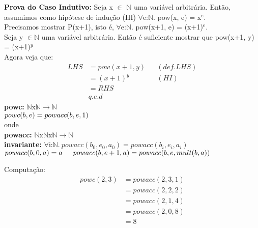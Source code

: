 \documentclass{article}
\begin{document}
\textbf{Prova do Caso Indutivo:} Seja x $\in$ $\mathbb{N}$ uma variável arbitrária. Então, assumimos como hipótese de indução (HI)
$\forall$e:$\mathbb{N}$. pow(x, e) = x$^e$.\\
Precisamos mostrar P(x+1), isto é, $\forall$e:$\mathbb{N}$. pow(x+1, e) = (x+1)$^e$.\\
Seja y $\in \mathbb{N}$ uma variável arbitrária. Então é suficiente mostrar que pow(x+1, y) = (x+1)$^y$\\
Agora veja que:
\begin{align*}
LHS &= pow(x+1, y) && (def. LHS)\\
&= (x+1)^y && (HI)\\
&= RHS \\
& q.e.d
\end{align*}
\noindent \textbf{powc:} $\mathbb{N}$x$\mathbb{N}$$ \rightarrow \mathbb{N}$\\
$powc(b, e) = powacc(b, e, 1)\\$
\\
onde\\
\indent \textbf{powacc:} $\mathbb{N}$x$\mathbb{N}$x$\mathbb{N}$$ \rightarrow \mathbb{N}$\\
\indent \textbf{invariante:} $\forall$i:$\mathbb{N}.\: powacc(b_0,e_0, a_0) = powacc(b_i, e_i, a_i)$\\
\indent $powacc(b, 0, a) = a\\
\indent powacc(b, e+1, a) = powacc(b, e, mult(b, a))\\$

Computação:\\
\begin{align*}
powc(2, 3) &= powacc(2, 3, 1)\\
&= powacc(2, 2, 2)\\
&= powacc(2, 1, 4)\\
&= powacc(2, 0, 8)\\
&= 8
\end{align*}
\end{document}
